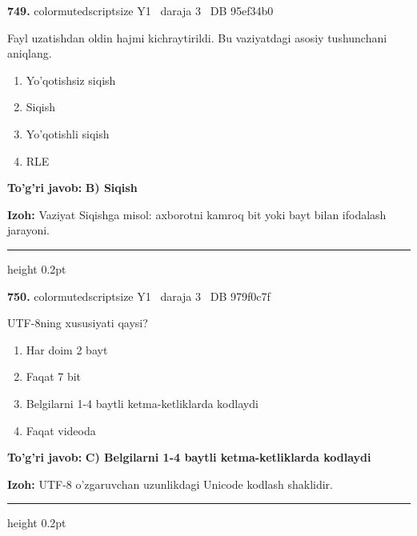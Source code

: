 \documentclass[10pt,a4paper,oneside]{article}
\begin{document}
\noindent\textbf{\color{ink}749.}  {color{muted}scriptsize Y1 \textbullet\ daraja 3 \textbullet\ DB 95ef34b0}
\par
Fayl uzatishdan oldin hajmi kichraytirildi. Bu vaziyatdagi asosiy tushunchani aniqlang.
\begin{enumerate}[label=\Alph*),leftmargin=9mm]
\item Yo'qotishsiz siqish
\item Siqish
\item Yo'qotishli siqish
\item RLE
\end{enumerate}
\begin{tcolorbox}[enhanced,breakable,colback=teal!4,colframe=teal!50!black,boxrule=0.5pt,arc=1.1mm,left=3mm,right=3mm,top=1.7mm,bottom=1.7mm,before skip=2mm,after skip=2mm]
\textbf{\color{teal}To'g'ri javob:} \textbf{B) Siqish}
\par\smallskip
\textbf{Izoh:} Vaziyat Siqishga misol: axborotni kamroq bit yoki bayt bilan ifodalash jarayoni.
\end{tcolorbox}
\vspace{2mm}\hrule height 0.2pt \vspace{3mm}

\noindent\textbf{\color{ink}750.}  {color{muted}scriptsize Y1 \textbullet\ daraja 3 \textbullet\ DB 979f0c7f}
\par
UTF-8ning xususiyati qaysi?
\begin{enumerate}[label=\Alph*),leftmargin=9mm]
\item Har doim 2 bayt
\item Faqat 7 bit
\item Belgilarni 1-4 baytli ketma-ketliklarda kodlaydi
\item Faqat videoda
\end{enumerate}
\begin{tcolorbox}[enhanced,breakable,colback=teal!4,colframe=teal!50!black,boxrule=0.5pt,arc=1.1mm,left=3mm,right=3mm,top=1.7mm,bottom=1.7mm,before skip=2mm,after skip=2mm]
\textbf{\color{teal}To'g'ri javob:} \textbf{C) Belgilarni 1-4 baytli ketma-ketliklarda kodlaydi}
\par\smallskip
\textbf{Izoh:} UTF-8 o'zgaruvchan uzunlikdagi Unicode kodlash shaklidir.
\end{tcolorbox}
\vspace{2mm}\hrule height 0.2pt \vspace{3mm}
\end{document}
